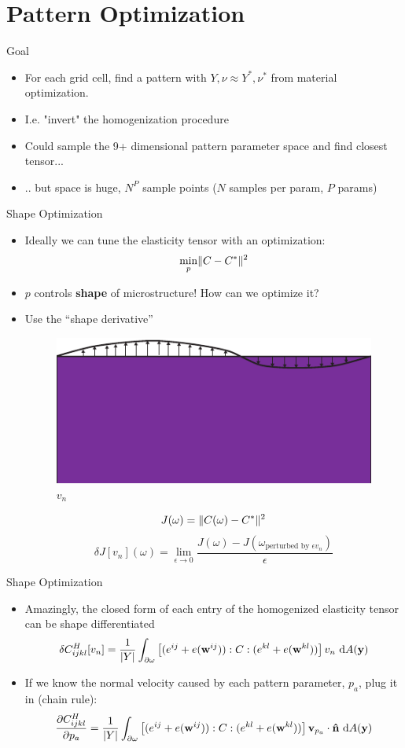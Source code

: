 \section{Pattern Optimization}
\begin{frame}{Goal}
    \begin{itemize}
        \item For each grid cell, find a pattern with $Y, \nu \approx Y^*, \nu^*$ from
   material optimization.
 \item I.e. "invert" the homogenization procedure
 \item Could sample the 9+ dimensional pattern parameter space and find closest
   tensor...
 \item .. but space is huge, $N^P$ sample points ($N$ samples per param, $P$ params)
\end{itemize}
\end{frame}

\begin{frame}{Shape Optimization}
    \begin{itemize}
\item Ideally we can tune the elasticity tensor with an optimization:
    $$ \min_p \lVert C - C^*\rVert^2 $$
\item $p$ controls {\bf shape} of microstructure! How can we optimize it?
\item Use the ``shape derivative''
    \begin{figure}
        \includegraphics[width=.35\textwidth]{Images/vn.pdf}
        $v_n$
    \end{figure}
        $$ J(\omega) = \lVert C(\omega) - C^*\rVert^2 $$
        $$
        \delta J[v_n](\omega) = \lim_{\epsilon \to 0} \frac{J(\omega) - J(\omega_{\text{perturbed by $\epsilon v_n$}})}{\epsilon}
        $$
    \end{itemize}
\end{frame}

\begin{frame}{Shape Optimization}
    \begin{itemize}
        \item Amazingly, the closed form of each entry of the homogenized elasticity tensor can be
              shape differentiated
                $$
                \delta C^H_{ijkl}[v_n] = \frac{1}{|Y|} \int_{\partial \omega} \left[(e^{ij} + e({\bf w}^{ij})) : C : (e^{kl} + e({\bf w}^{kl}))\right] v_n \, \, \mathrm{d}A({\bf y})
                $$
            \item If we know the normal velocity caused by each pattern parameter, $p_a$, plug it in (chain rule):
              $$
              \frac{\partial C^H_{ijkl}}{\partial p_a} =
              \frac{1}{|Y|} \int_{\partial \omega} \left[(e^{ij} + e({\bf w}^{ij})) : C : (e^{kl} + e({\bf w}^{kl}))\right] {\bf v}_{p_a} \cdot {\bf \hat{n}} \, \, \mathrm{d}A({\bf y})
              $$
    \end{itemize}
\end{frame}

